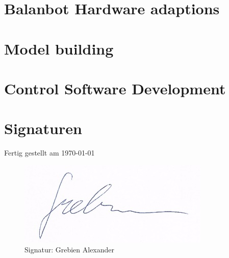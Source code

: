\newcommand{\german}{false} %
\newcommand{\coloredTitlePage}{true} %
\newcommand{\company}{false}
\newcommand{\ECE}{true}

\usepackage{hyperref}

\makeglossaries

\makeatletter
\newcommand{\myscope}[2] %
{\draw[thick,rotate=#2] (#1) circle (12pt)
 (#1) ++(-0.35,-0.1) -- ++(0.3,0.3) --++(0,-0.3)-- ++(0.3,0.3) --++(0,-0.3);
}
\newcommand{\costumPicWidth}[0]{
0.8\textwidth
}

\newcommand{\costumPlotWidth}[0]{
\textwidth
}






\frontmatter
\renewcommand{\thepage}{\Roman{page}}



\tableofcontents
\printglossary
\mainmatter
\chapter{Balanbot Hardware adaptions}


\chapter{Model building}


\chapter{Control Software Development}


\newpage
\chapter{Signaturen}
    Fertig gestellt am \today \\
    \begin{figure}[H]
        \centering
        \includegraphics{LaTeX/pics/signature_grebien.png}
    	\caption{Signatur: Grebien Alexander}
    	\label{pic:signatur_grebien}
    \end{figure}
        
\listoffigures
\listoftables



